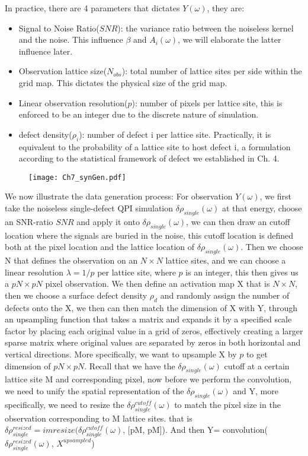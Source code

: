 In practice, there are 4 parameters that dictates $Y(\omega)$, they are:
\begin{itemize}
	\item Signal to Noise Ratio($SNR$): the variance ratio between the noiseless kernel and the noise. This influence $\beta$ and $A_i(\omega)$, we will elaborate the latter influence later. 
	\item Observation lattice size($N_{obs}$): total number of lattice sites per side within the grid map. This dictates the physical size of the grid map. 
	\item Linear observation resolution($p$): number of pixels per lattice site, this is enforced to be an integer due to the discrete nature of simulation. 
	\item defect density($\rho_i$): number of defect i per lattice site. Practically, it is equivalent to the probability of a lattice site to host defect i, a formulation according to the statistical framework of defect we established in Ch. 4.
\end{itemize}
\begin{figure}
	\texttt{[image: Ch7\_synGen.pdf]} 
	\centering
	\caption{}
	\label{fig:ch7syn}
\end{figure}
We now illustrate the data generation process: 
For observation $Y(\omega)$, we first take the noiseless single-defect QPI simulation $\delta\rho_{single} (\omega)$ at that energy, choose an SNR-ratio $SNR$ and apply it onto $\delta\rho_{single} (\omega)$, we can then draw an cutoff location where the signals are buried in the noise, this cutoff location is defined both at the pixel location and the lattice location of $\delta\rho_{single} (\omega)$. Then we choose N that defines the observation on an $N\times N$ lattice sites, and we can choose a linear resolution $\lambda = 1/p$ per lattice site, where $p$ is an integer, this then gives us a $pN \times pN$ pixel observation.
We then define an activation map X that is $N\times N$, then we choose a surface defect density $\rho_d$ and randomly assign the number of defects onto the X, we then can then match the dimension of X with Y, through an upsampling function that takes a matrix and expands it by a specified scale factor by placing each original value in a grid of zeros, effectively creating a larger sparse matrix where original values are separated by zeros in both horizontal and vertical directions. More specifically, we want to upsample X by $p$ to get dimension of $pN \times pN$. 
Recall that we have the $\delta\rho_{single} (\omega)$ cutoff at a certain lattice site M and corresponding pixel, now before we perform the convolution, we need to unify the spatial representation of the $\delta\rho_{single} (\omega)$ and Y, more specifically, we need to resize the $\delta\rho^{cutoff}_{single} (\omega)$ to match the pixel size in the observation corresponding to M lattice sites. that is $\delta\rho^{resized}_{single}= imresize(\delta\rho^{cutoff}_{single} (\omega)$, [pM, pM]). And then Y= convolution($\delta\rho^{resized}_{single} (\omega)$, $X^{upsampled}$)

